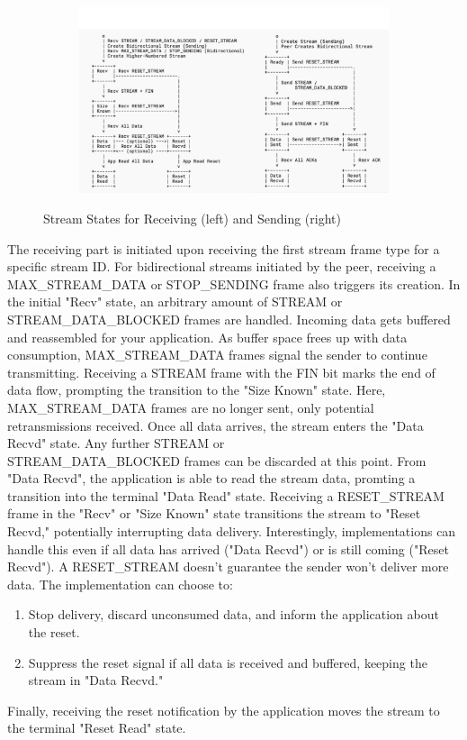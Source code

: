 \begin{figure}[h]
  \centering
  \begin{subfigure}[b]{1.0\textwidth}
    \includegraphics[width=1.0\linewidth]{img/stream_states.png}
  \end{subfigure}
  \caption{Stream States for Receiving (left) and Sending (right) \cite[16-18]{rfc9000}}
  \label{grafik_stream_states}
\end{figure}

The receiving part is initiated upon receiving the first stream frame type for a specific stream ID. For bidirectional streams initiated by the peer, receiving a \\ MAX\_STREAM\_DATA or STOP\_SENDING frame also triggers its creation. In the initial "Recv" state, an arbitrary amount of STREAM or STREAM\_DATA\_BLOCKED frames are handled. Incoming data gets buffered and reassembled for your application. As buffer space frees up with data consumption, MAX\_STREAM\_DATA frames signal the sender to continue transmitting. Receiving a STREAM frame with the FIN bit marks the end of data flow, prompting the transition to the "Size Known" state. Here, MAX\_STREAM\_DATA frames are no longer sent, only potential retransmissions received. Once all data arrives, the stream enters the "Data Recvd" state. Any further STREAM or \\ STREAM\_DATA\_BLOCKED frames can be discarded at this point. From "Data Recvd", the application is able to read the stream data, promting a transition into the terminal "Data Read" state. Receiving a RESET\_STREAM frame in the "Recv" or "Size Known" state transitions the stream to "Reset Recvd," potentially interrupting data delivery. Interestingly, implementations can handle this even if all data has arrived ("Data Recvd") or is still coming ("Reset Recvd"). A RESET\_STREAM doesn't guarantee the sender won't deliver more data. The implementation can choose to:
\begin{enumerate}
    \item Stop delivery, discard unconsumed data, and inform the application about the reset.
    \item Suppress the reset signal if all data is received and buffered, keeping the stream in "Data Recvd."
\end{enumerate}
Finally, receiving the reset notification by the application moves the stream to the terminal "Reset Read" state. \\

